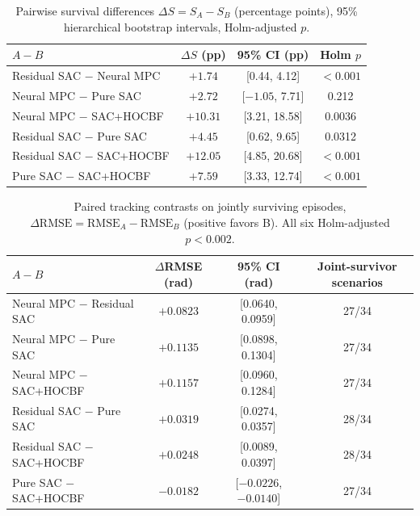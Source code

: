 \documentclass[preprint,12pt,authoryear=false]{elsarticle}
\theoremstyle{remark}\newtheorem{remark}{Remark}
\theoremstyle{plain}\newtheorem{proposition}{Proposition}\newtheorem{lemma}{Lemma}
\theoremstyle{definition}\newtheorem{assumption}{Assumption}
\begin{document}
\begin{table}[t]\centering\small
\caption{Pairwise survival differences $\Delta S=S_A-S_B$ (percentage points), 95\% hierarchical bootstrap intervals, Holm-adjusted $p$.}\label{tab:p1}
\begin{tabular}{lccc}\toprule
$A-B$ & $\Delta S$ (pp) & 95\% CI (pp) & Holm $p$\\\midrule
Residual SAC $-$ Neural MPC & $+1.74$ & [0.44, 4.12] & $<0.001$\\
Neural MPC $-$ Pure SAC & $+2.72$ & [$-1.05$, 7.71] & 0.212\\
Neural MPC $-$ SAC+HOCBF & $+10.31$ & [3.21, 18.58] & 0.0036\\
Residual SAC $-$ Pure SAC & $+4.45$ & [0.62, 9.65] & 0.0312\\
Residual SAC $-$ SAC+HOCBF & $+12.05$ & [4.85, 20.68] & $<0.001$\\
Pure SAC $-$ SAC+HOCBF & $+7.59$ & [3.33, 12.74] & $<0.001$\\\bottomrule
\end{tabular}
\end{table}
\begin{table}[t]\centering\small
\caption{Paired tracking contrasts on jointly surviving episodes, $\Delta\mathrm{RMSE}=\mathrm{RMSE}_A-\mathrm{RMSE}_B$ (positive favors B). All six Holm-adjusted $p<0.002$.}\label{tab:p2}
\begin{tabular}{lccc}\toprule
$A-B$ & $\Delta$RMSE (rad) & 95\% CI (rad) & Joint-survivor scenarios\\\midrule
Neural MPC $-$ Residual SAC & $+0.0823$ & [0.0640, 0.0959] & 27/34\\
Neural MPC $-$ Pure SAC & $+0.1135$ & [0.0898, 0.1304] & 27/34\\
Neural MPC $-$ SAC+HOCBF & $+0.1157$ & [0.0960, 0.1284] & 27/34\\
Residual SAC $-$ Pure SAC & $+0.0319$ & [0.0274, 0.0357] & 28/34\\
Residual SAC $-$ SAC+HOCBF & $+0.0248$ & [0.0089, 0.0397] & 28/34\\
Pure SAC $-$ SAC+HOCBF & $-0.0182$ & [$-0.0226$, $-0.0140$] & 27/34\\\bottomrule
\end{tabular}
\end{table}
\end{document}

